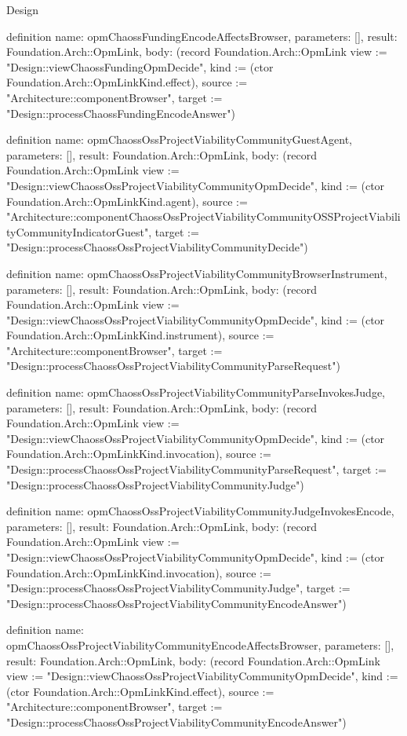 \begin{lexlean}{Design}
\begin{semanticmodule}
definition{
  name: opmChaossFundingEncodeAffectsBrowser,
  parameters: [],
  result: Foundation.Arch::OpmLink,
  body: (record Foundation.Arch::OpmLink {view := "Design::viewChaossFundingOpmDecide", kind := (ctor Foundation.Arch::OpmLinkKind.effect), source := "Architecture::componentBrowser", target := "Design::processChaossFundingEncodeAnswer"})
}

definition{
  name: opmChaossOssProjectViabilityCommunityGuestAgent,
  parameters: [],
  result: Foundation.Arch::OpmLink,
  body: (record Foundation.Arch::OpmLink {view := "Design::viewChaossOssProjectViabilityCommunityOpmDecide", kind := (ctor Foundation.Arch::OpmLinkKind.agent), source := "Architecture::componentChaossOssProjectViabilityCommunityOSSProjectViabilityCommunityIndicatorGuest", target := "Design::processChaossOssProjectViabilityCommunityDecide"})
}

definition{
  name: opmChaossOssProjectViabilityCommunityBrowserInstrument,
  parameters: [],
  result: Foundation.Arch::OpmLink,
  body: (record Foundation.Arch::OpmLink {view := "Design::viewChaossOssProjectViabilityCommunityOpmDecide", kind := (ctor Foundation.Arch::OpmLinkKind.instrument), source := "Architecture::componentBrowser", target := "Design::processChaossOssProjectViabilityCommunityParseRequest"})
}

definition{
  name: opmChaossOssProjectViabilityCommunityParseInvokesJudge,
  parameters: [],
  result: Foundation.Arch::OpmLink,
  body: (record Foundation.Arch::OpmLink {view := "Design::viewChaossOssProjectViabilityCommunityOpmDecide", kind := (ctor Foundation.Arch::OpmLinkKind.invocation), source := "Design::processChaossOssProjectViabilityCommunityParseRequest", target := "Design::processChaossOssProjectViabilityCommunityJudge"})
}

definition{
  name: opmChaossOssProjectViabilityCommunityJudgeInvokesEncode,
  parameters: [],
  result: Foundation.Arch::OpmLink,
  body: (record Foundation.Arch::OpmLink {view := "Design::viewChaossOssProjectViabilityCommunityOpmDecide", kind := (ctor Foundation.Arch::OpmLinkKind.invocation), source := "Design::processChaossOssProjectViabilityCommunityJudge", target := "Design::processChaossOssProjectViabilityCommunityEncodeAnswer"})
}

definition{
  name: opmChaossOssProjectViabilityCommunityEncodeAffectsBrowser,
  parameters: [],
  result: Foundation.Arch::OpmLink,
  body: (record Foundation.Arch::OpmLink {view := "Design::viewChaossOssProjectViabilityCommunityOpmDecide", kind := (ctor Foundation.Arch::OpmLinkKind.effect), source := "Architecture::componentBrowser", target := "Design::processChaossOssProjectViabilityCommunityEncodeAnswer"})
}


\end{semanticmodule}
\end{lexlean}
